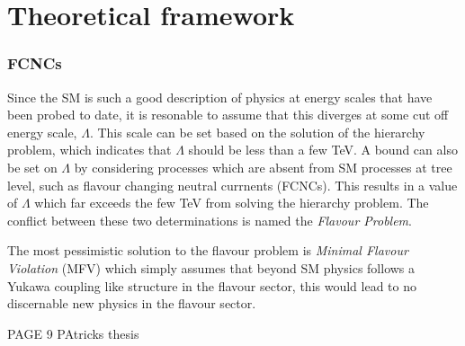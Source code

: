 \chapter{Theoretical framework}
\label{ch:theory}






\subsection{FCNCs}
Since the SM is such a good description of physics at energy scales that have been probed to date,
it is resonable to assume that this diverges at some cut off energy scale, $\Lambda$.
This scale can be set based on the solution of the hierarchy problem, which indicates that
$\Lambda$ should be less than a few TeV.
A bound can also be set on $\Lambda$ by considering processes which are absent from SM processes at
tree level, such as flavour changing neutral currnents (FCNCs).
This results in a value of $\Lambda$ which far exceeds the few TeV from solving the hierarchy
problem.
The conflict between these two determinations is named the \emph{Flavour Problem}.

The most pessimistic solution to the flavour problem is \emph{Minimal Flavour Violation} (MFV)
which simply assumes that beyond SM physics follows a Yukawa coupling like structure in the flavour
sector, this would lead to no discernable new physics in the flavour sector.



PAGE 9 PAtricks thesis




%





